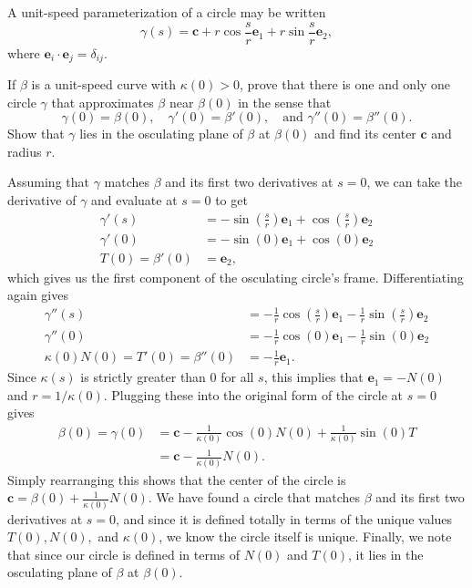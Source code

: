 \documentclass[10pt]{report}
\begin{document}
\begin{exer}[2.3: 6]
A unit-speed parameterization of a circle may be written
\[
	\gamma(s) = \mathbf{c} + r\cos \frac{s}{r} \mathbf{e}_1 + r \sin \frac{s}{r} \mathbf{e}_2,
\] where $\mathbf{e}_i \cdot \mathbf{e}_j = \delta_{ij}$.

If $\beta$ is a unit-speed curve with $\kappa(0)>0$, prove that there is one and only one circle $\gamma$ that approximates $\beta$ near $\beta(0)$ in the sense that
\[
	\gamma(0)=\beta(0), \quad \gamma'(0) = \beta'(0), \quad \text{and } \gamma''(0) = \beta''(0).
\] Show that $\gamma$ lies in the osculating plane of $\beta$ at $\beta(0)$ and find its center $\mathbf{c}$ and radius $r$.
\end{exer}
Assuming that $\gamma$ matches $\beta$ and its first two derivatives at $s=0$, we can take the derivative of $\gamma$ and evaluate at $s=0$ to get
\begin{align*}
	\gamma'(s) &= -\sin\left( \frac{s}{r}  \right)\mathbf{e}_1 + \cos\left( \frac{s}{r}  \right)\mathbf{e}_2 \\
	\gamma'(0) &= -\sin(0) \mathbf{e}_1 + \cos(0)\mathbf{e}_2 \\
	T(0) = \beta'(0) &= \mathbf{e}_2,
\end{align*}
which gives us the first component of the osculating circle's frame. Differentiating again gives
\begin{align*}
	\gamma''(s) &= -\frac{1}{r} \cos\left(  \frac{s}{r} \right)\mathbf{e}_1 - \frac{1}{r} \sin\left( \frac{s}{r}  \right)\mathbf{e}_2 \\
	\gamma''(0) &= -\frac{1}{r} \cos(0) \mathbf{e}_1 - \frac{1}{r} \sin(0) \mathbf{e}_2 \\
	\kappa(0)N(0) = T'(0) = \beta''(0) &= -\frac{1}{r} \mathbf{e}_1.
\end{align*}
Since $\kappa(s)$ is strictly greater than 0 for all $s$, this implies that $\mathbf{e}_1=-N(0)$ and $r=1/\kappa(0)$. Plugging these into the original form of the circle at $s=0$ gives
\begin{align*}
	\beta(0) = \gamma(0) &= \mathbf{c} - \frac{1}{\kappa(0)} \cos(0)N(0) + \frac{1}{\kappa(0)} \sin(0) T \\
			     &= \mathbf{c} - \frac{1}{\kappa(0)} N(0).
\end{align*}
Simply rearranging this shows that the center of the circle is $\mathbf{c}=\beta(0) + \frac{1}{\kappa(0)} N(0)$. We have found a circle that matches $\beta$ and its first two derivatives at $s=0$, and since it is defined totally in terms of the unique values $T(0), N(0),$ and $\kappa(0)$, we know the circle itself is unique. Finally, we note that since our circle is defined in terms of $N(0)$ and $T(0)$, it lies in the osculating plane of $\beta$ at $\beta(0)$.
\end{document}
